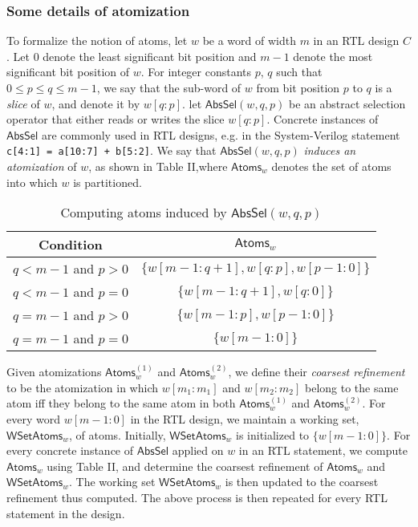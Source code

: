 \documentclass{llncs}
\newcommand{\AbsSel}{\ensuremath{\mathsf{AbsSel}}}
\newcommand{\Atoms}{\ensuremath{\mathsf{Atoms}}}
\begin{document}
\subsubsection{Some details of atomization}
To formalize the notion of atoms, let $w$ be a word of width $m$ in an
RTL design $C$.  Let $0$ denote the least significant bit position and
$m-1$ denote the most significant bit position of $w$.  For integer
constants $p$, $q$ such that $0 \le p \le q \le m-1$, we say that the
sub-word of $w$ from bit position $p$ to $q$ is a \emph{slice} of $w$,
and denote it by $w[q:p]$.  let ${\AbsSel}(w, q, p)$ be an abstract
selection operator that either reads or writes the slice $w[q:p]$.
Concrete instances of $\mathsf{AbsSel}$ are commonly used in RTL
designs, e.g. in the System-Verilog statement {\tt c[4:1] = a[10:7] +
  b[5:2]}. We say that ${\AbsSel}(w, q, p)$ \emph{induces an
  atomization} of $w$, as shown in Table II,where
${\Atoms}_w$ denotes the set of atoms into which $w$ is partitioned.
\begin{table}
\begin{center}
\begin{tabular}{|c|c|}
\hline
{\bfseries Condition} & {\bfseries ${\Atoms}_w$} \\
\hline
$q < m-1$ and $p > 0$ & $\{w[m-1:q+1], w[q:p], w[p-1:0]\}$ \\
\hline
$q < m-1$ and $p = 0$ & $\{w[m-1:q+1], w[q:0]\}$ \\
\hline
$q = m-1$ and $p > 0$ & $\{w[m-1:p], w[p-1:0]\}$\\
\hline
$q = m-1$ and $p = 0$ & $\{w[m-1:0]\}$\\
\hline
\end{tabular}
\caption{Computing atoms induced by ${\AbsSel}(w, q, p)$}
\end{center}
\end{table}\label{atoms}

Given atomizations ${\Atoms}^{(1)}_w$ and ${\Atoms}^{(2)}_w$, we
define their \emph{coarsest refinement} to be the atomization in which
$w[m_1:m_1]$ and $w[m_2:m_2]$ belong to the same atom iff they belong
to the same atom in both ${\Atoms}^{(1)}_w$ and
${\Atoms}^{(2)}_w$.  For every word $w[m-1:0]$ in the RTL
design, we maintain a working set, $\mathsf{WSetAtoms}_w$, of atoms.
Initially, $\mathsf{WSetAtoms}_w$ is initialized to $\{w[m-1:0]\}$.
For every concrete instance of ${\AbsSel}$ applied on $w$ in an RTL
statement, we compute ${\Atoms}_w$ using Table II, and
determine the coarsest refinement of ${\Atoms}_w$ and
$\mathsf{WSetAtoms}_w$.  The working set $\mathsf{WSetAtoms}_w$ is
then updated to the coarsest refinement thus computed.  The above
process is then repeated for every RTL statement in the design.
\end{document}
